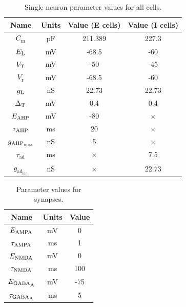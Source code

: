 \documentclass[a4paper,12pt]{article}
\newcommand{\ssc}[3]{\ensuremath{#1_{\text{#2}_{\text{#3}}}}}
\newcommand{\Cm}       {\ssc{C}      {m}     {}}
\newcommand{\gL}       {\ssc{g}      {\scriptsize{L}}  {}}
\newcommand{\EL}       {\ssc{E}      {\scriptsize{L}}  {}}
\newcommand{\gAHPmax}  {\ssc{g}      {\scriptsize{AHP}}{max}}
\newcommand{\EAHP}     {\ssc{E}      {\scriptsize{AHP}}{}}
\newcommand{\tauAHP}   {\ssc{\tau}   {\scriptsize{AHP}}{}}
\newcommand{\VT}       {\ssc{V}      {\scriptsize{T}}  {}}
\newcommand{\Vr}       {\ssc{V}      {r}     {}}
\newcommand{\EGABAA}   {\ssc{E}      {\scriptsize{GABA}}{\scriptsize{A}}}
\newcommand{\tauGABAA} {\ssc{\tau}   {\scriptsize{GABA}}{\scriptsize{A}}}
\newcommand{\EAMPA}    {\ssc{E}      {\scriptsize{AMPA}}{}}
\newcommand{\tauAMPA}  {\ssc{\tau}   {\scriptsize{AMPA}}{}}
\newcommand{\ENMDA}    {\ssc{E}      {\scriptsize{NMDA}}{}}
\newcommand{\tauNMDA}  {\ssc{\tau}   {\scriptsize{NMDA}}{}}
\newcommand{\tauad}    {\ssc{\tau}   {ad}{}}
\newcommand{\gadinc}   {\ssc{g}      {ad}{inc}}
\newcommand{\deltaT}   {\ssc{\Delta} {\scriptsize{T}}{}}
\begin{document}
\begin{table}
    \centering
    \begin{tabular}{| c | c | c | c |}
        \hline
        Name       & Units & Value (E cells) & Value (I cells) \\
        \hline\hline
        $\Cm$      & pF    & 211.389         & 227.3    \\
        $\EL$      & mV    & -68.5           & -60      \\
        $\VT$      & mV    & -50             & -45      \\
        $\Vr$      & mV    & -68.5           & -60      \\
        $\gL$      & nS    & 22.73           & 22.73    \\
        $\deltaT$  & mV    & 0.4             & 0.4      \\
        $\EAHP$    & mV    & -80             & $\times$ \\
        $\tauAHP$  & ms    & 20              & $\times$ \\
        $\gAHPmax$ & nS    & 5               & $\times$ \\
        $\tauad$   & ms    & $\times$        & 7.5      \\
        $\gadinc$  & nS    & $\times$        & 22.73    \\
        \hline
    \end{tabular}
    \caption{Single neuron parameter values for all cells.}
    \label{tab:params_E}
\end{table}

\begin{table}
    \centering
    \begin{tabular}{| c | c | c |}
        \hline
        Name       & Units & Value \\
        \hline\hline
        $\EAMPA$   & mV    & 0     \\
        $\tauAMPA$ & ms    & 1     \\
        $\ENMDA$   & mV    & 0     \\
        $\tauNMDA$ & ms    & 100   \\
        $\EGABAA$  & mV    & -75   \\
        $\tauGABAA$& ms    & 5     \\
        \hline
    \end{tabular}
    \caption{Parameter values for synapses.}
    \label{tab:params_synapses}
\end{table}
\end{document}
